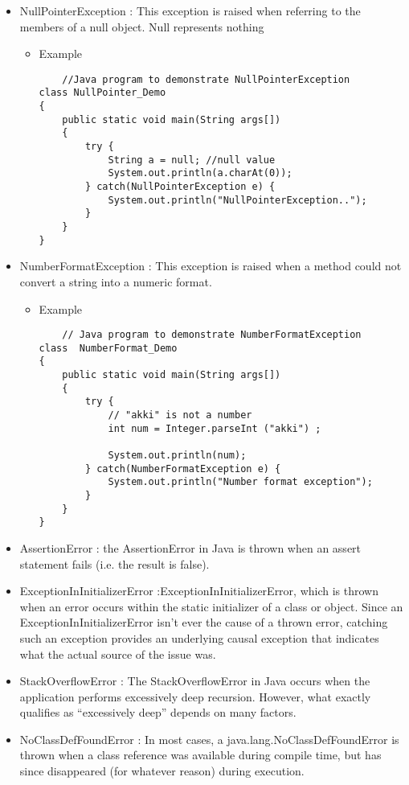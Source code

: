 \documentclass{article}
\begin{document}
\begin{itemize}
\begin{itemize}
\begin{lstlisting}
        \end{lstlisting}
    \end{itemize}

\item NullPointerException : This exception is raised when referring to the members of a null object. Null represents nothing
\begin{itemize}
    \item Example
    \begin{lstlisting}
    //Java program to demonstrate NullPointerException 
class NullPointer_Demo 
{ 
    public static void main(String args[]) 
    { 
        try { 
            String a = null; //null value 
            System.out.println(a.charAt(0)); 
        } catch(NullPointerException e) { 
            System.out.println("NullPointerException.."); 
        } 
    } 
} 

    \end{lstlisting}
\end{itemize}

\item NumberFormatException : This exception is raised when a method could not convert a string into a numeric format.
\begin{itemize}
    \item Example
    \begin{lstlisting}
    // Java program to demonstrate NumberFormatException 
class  NumberFormat_Demo 
{ 
    public static void main(String args[]) 
    { 
        try { 
            // "akki" is not a number 
            int num = Integer.parseInt ("akki") ; 
  
            System.out.println(num); 
        } catch(NumberFormatException e) { 
            System.out.println("Number format exception"); 
        } 
    } 
} 
    \end{lstlisting}
\end{itemize}
\item AssertionError : the AssertionError in Java is thrown when an assert statement fails (i.e. the result is false).

\item ExceptionInInitializerError :ExceptionInInitializerError, which is thrown when an error occurs within the static initializer of a class or object. Since an ExceptionInInitializerError isn’t ever the cause of a thrown error, catching such an exception provides an underlying causal exception that indicates what the actual source of the issue was.


\item StackOverflowError : The StackOverflowError in Java occurs when the application performs excessively deep recursion. However, what exactly qualifies as “excessively deep” depends on many factors.

\item NoClassDefFoundError : In most cases, a java.lang.NoClassDefFoundError is thrown when a class reference was available during compile time, but has since disappeared (for whatever reason) during execution.

\end{itemize}
\end{document}
